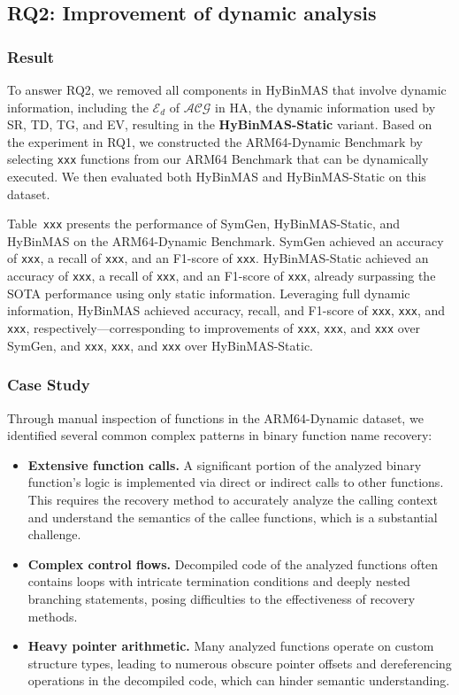 \documentclass[acmsmall,screen,review,anonymous]{acmart} %
\begin{document}
\subsection{RQ2: Improvement of dynamic analysis}
\subsubsection{Result}
To answer RQ2, we removed all components in HyBinMAS that involve dynamic information, including the $\mathcal{E}_d$ of $\mathcal{ACG}$ in HA, the dynamic information used by SR, TD, TG, and EV, resulting in the \textbf{HyBinMAS-Static} variant. Based on the experiment in RQ1, we constructed the ARM64-Dynamic Benchmark by selecting \texttt{xxx} functions from our ARM64 Benchmark that can be dynamically executed. We then evaluated both HyBinMAS and HyBinMAS-Static on this dataset.

Table~\texttt{xxx} presents the performance of SymGen, HyBinMAS-Static, and HyBinMAS on the ARM64-Dynamic Benchmark. SymGen achieved an accuracy of \texttt{xxx}, a recall of \texttt{xxx}, and an F1-score of \texttt{xxx}. HyBinMAS-Static achieved an accuracy of \texttt{xxx}, a recall of \texttt{xxx}, and an F1-score of \texttt{xxx}, already surpassing the SOTA performance using only static information. Leveraging full dynamic information, HyBinMAS achieved accuracy, recall, and F1-score of \texttt{xxx}, \texttt{xxx}, and \texttt{xxx}, respectively—corresponding to improvements of \texttt{xxx}, \texttt{xxx}, and \texttt{xxx} over SymGen, and \texttt{xxx}, \texttt{xxx}, and \texttt{xxx} over HyBinMAS-Static.

\subsubsection{Case Study}
Through manual inspection of functions in the ARM64-Dynamic dataset, we identified several common complex patterns in binary function name recovery:

\begin{itemize}
    \item \textbf{Extensive function calls.} A significant portion of the analyzed binary function’s logic is implemented via direct or indirect calls to other functions. This requires the recovery method to accurately analyze the calling context and understand the semantics of the callee functions, which is a substantial challenge.
    \item \textbf{Complex control flows.} Decompiled code of the analyzed functions often contains loops with intricate termination conditions and deeply nested branching statements, posing difficulties to the effectiveness of recovery methods.
    \item \textbf{Heavy pointer arithmetic.} Many analyzed functions operate on custom structure types, leading to numerous obscure pointer offsets and dereferencing operations in the decompiled code, which can hinder semantic understanding.
\end{itemize}
\end{document}
